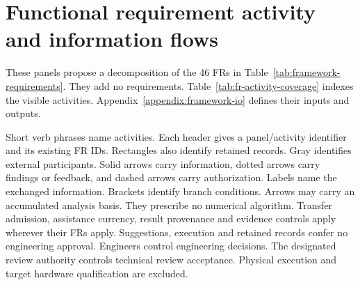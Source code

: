 \chapter{Functional requirement activity and information flows}
\label{appendix:fr-activity-flows}

\begingroup
\renewcommand{\baselinestretch}{1.0}
\small
These panels propose a decomposition of the 46 FRs in Table~\ref{tab:framework-requirements}. They add no requirements. Table~\ref{tab:fr-activity-coverage} indexes the visible activities. Appendix~\ref{appendix:framework-io} defines their inputs and outputs.

Short verb phrases name activities. Each header gives a panel/activity identifier and its existing FR IDs. Rectangles also identify retained records. Gray identifies external participants. Solid arrows carry information, dotted arrows carry findings or feedback, and dashed arrows carry authorization. Labels name the exchanged information. Brackets identify branch conditions. Arrows may carry an accumulated analysis basis. They prescribe no numerical algorithm. Transfer admission, assistance currency, result provenance and evidence controls apply wherever their FRs apply. Suggestions, execution and retained records confer no engineering approval. Engineers control engineering decisions. The designated review authority controls technical review acceptance. Physical execution and target hardware qualification are excluded.
\par
\endgroup


